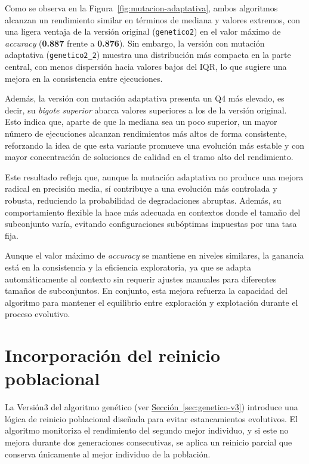 Como se observa en la Figura~\ref{fig:mutacion-adaptativa}, ambos algoritmos alcanzan un rendimiento similar en términos de mediana y valores extremos,
con una ligera ventaja de la versión original (\texttt{genetico2}) en el valor máximo de \textit{accuracy} (\textbf{0.887} frente a \textbf{0.876}).
Sin embargo, la versión con mutación adaptativa (\texttt{genetico2\_2}) muestra una distribución más compacta en la parte central,
con menos dispersión hacia valores bajos del IQR, lo que sugiere una mejora en la consistencia entre ejecuciones.

Además, la versión con mutación adaptativa presenta un Q4 más elevado, es decir, su \textit{bigote superior} abarca valores superiores a los de la versión original.
Esto indica que, aparte de que la mediana sea un poco superior, un mayor número de ejecuciones alcanzan rendimientos más altos de forma consistente,
reforzando la idea de que esta variante promueve una evolución más estable y con mayor concentración de soluciones de calidad en el tramo alto del rendimiento.

Este resultado refleja que, aunque la mutación adaptativa no produce una mejora radical en precisión media,
sí contribuye a una evolución más controlada y robusta, reduciendo la probabilidad de degradaciones abruptas.
Además, su comportamiento flexible la hace más adecuada en contextos donde el tamaño del subconjunto varía,
evitando configuraciones subóptimas impuestas por una tasa fija.

Aunque el valor máximo de \textit{accuracy} se mantiene en niveles similares, la ganancia está en la consistencia y la eficiencia exploratoria,
ya que se adapta automáticamente al contexto sin requerir ajustes manuales para diferentes tamaños de subconjuntos.
En conjunto, esta mejora refuerza la capacidad del algoritmo para mantener el equilibrio entre exploración y explotación durante el proceso evolutivo.


\section{Incorporación del reinicio poblacional}\label{sec:incorporacion-reinicio-poblacional}
La Versión3 del algoritmo genético (ver \hyperref[sec:genetico-v3]{Sección~\ref*{sec:genetico-v3}})
introduce una lógica de reinicio poblacional diseñada para evitar estancamientos evolutivos.
El algoritmo monitoriza el rendimiento del segundo mejor individuo, y si este no mejora durante dos generaciones consecutivas,
se aplica un reinicio parcial que conserva únicamente al mejor individuo de la población.

